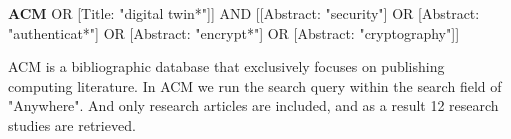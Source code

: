 \begin{tcolorbox}[colback=black!5!white, sharp corners=all, colframe=white!95!black]
\textbf{ACM}
\tcblower
[[Title: "digital-twin*"] OR [Title: "digital twin*"]] AND [[Abstract: "security"] OR [Abstract: "authenticat*"] OR [Abstract: "encrypt*"] OR [Abstract: "cryptography"]]

\end{tcolorbox}
ACM is a bibliographic database that exclusively focuses on publishing computing literature. In ACM we run the search query within the search field of "Anywhere". And only research articles are included, and as a result 12 research studies are retrieved. 





